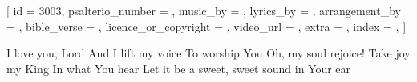 
[
    id = {3003},
    psalterio_number = {},
    music_by = {},
    lyrics_by = {},
    arrangement_by = {},
    bible_verse = {},
    licence_or_copyright = {},
    video_url = {},
    extra = {},
    index = {},
]


\beginverse
	
I love you, Lord 
And I lift my voice 
To worship You 
Oh, my soul rejoice! 
Take joy my King 
In what You hear 
Let it be a sweet, sweet sound in Your ear 

\endverse





\endsong
